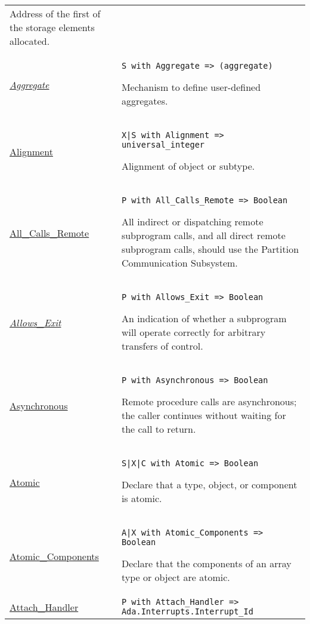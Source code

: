 \documentclass[english]{article}
\begin{document}
\begin{scriptsize}
\begin{multicols*}{3}
\begin{tabular}{@{}p{2cm}p{6.5cm}}
   Address of the first of the storage elements allocated.\\

   \href{http://www.ada-auth.org/standards/22rm/html/RM-4-3-5.html}{\textit{Aggregate}} & \texttt{S with Aggregate => (aggregate)}

   Mechanism to define user-defined aggregates.\\

   \href{http://www.ada-auth.org/standards/22rm/html/RM-13-3.html}{Alignment} & \texttt{X|S with Alignment => universal\_integer}

   Alignment of object or subtype.\\

   \href{http://www.ada-auth.org/standards/22rm/html/RM-E-2-3.html}{All\_Calls\_Remote} & \texttt{P with All\_Calls\_Remote => Boolean}

   All indirect or dispatching remote subprogram calls, and all direct remote subprogram calls, should use the Partition Communication Subsystem.\\

   \href{http://www.ada-auth.org/standards/22rm/html/RM-5-5-3.html}{\textit{Allows\_Exit}} & \texttt{P with Allows\_Exit => Boolean}

   An indication of whether a subprogram will operate correctly for arbitrary transfers of control.\\

   \href{http://www.ada-auth.org/standards/22rm/html/RM-E-4-1.html}{Asynchronous} & \texttt{P with Asynchronous => Boolean}

   Remote procedure calls are asynchronous; the caller continues without waiting for the call to return.\\

   \href{http://www.ada-auth.org/standards/22rm/html/RM-C-6.html}{Atomic} & \texttt{S|X|C with Atomic => Boolean}

   Declare that a type, object, or component is atomic.\\

   \href{http://www.ada-auth.org/standards/22rm/html/RM-C-6.html}{Atomic\_Components} & \texttt{A|X with Atomic\_Components => Boolean}

   Declare that the components of an array type or object are atomic.\\

   \href{http://www.ada-auth.org/standards/22rm/html/RM-C-3-1.html}{Attach\_Handler} & \texttt{P with Attach\_Handler => Ada.Interrupts.\allowbreak Interrupt\_Id}


\end{tabular}
\end{multicols*}
\end{scriptsize}
\end{document}
